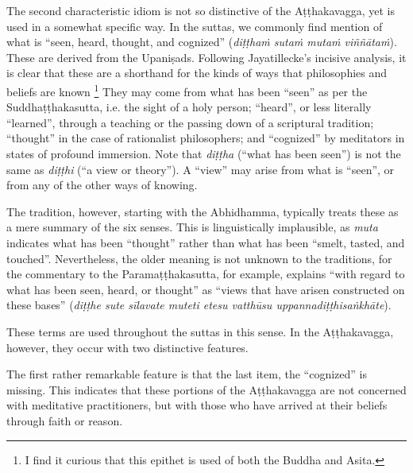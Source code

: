 \documentclass[12pt,openany]{book}%
\begin{document}
The second characteristic idiom is not so distinctive of the \textsanskrit{Aṭṭhakavagga}, yet is used in a somewhat specific way. In the suttas, we commonly find mention of what is “seen, heard, thought, and cognized” (\textit{\textsanskrit{diṭṭhaṁ} \textsanskrit{sutaṁ} \textsanskrit{mutaṁ} \textsanskrit{viññātaṁ}}). These are derived from the \textsanskrit{Upaniṣads}. Following Jayatillecke’s incisive analysis, it is clear that these are a shorthand for the kinds of ways that philosophies and beliefs are known \footnote{I find it curious that this epithet is used of both the Buddha and Asita. } They may come from what has been “seen” as per the \textsanskrit{Suddhaṭṭhakasutta}, i.e. the sight of a holy person; “heard”, or less literally “learned”, through a teaching or the passing down of a scriptural tradition; “thought” in the case of rationalist philosophers; and “cognized” by meditators in states of profound immersion. Note that \textit{\textsanskrit{diṭṭha}} (“what has been seen”) is not the same as \textit{\textsanskrit{diṭṭhi}} (“a view or theory”). A “view” may arise from what is “seen”, or from any of the other ways of knowing.

The tradition, however, starting with the Abhidhamma, typically treats these as a mere summary of the six senses. This is linguistically implausible, as \textit{muta} indicates what has been “thought” rather than what has been “smelt, tasted, and touched”. Nevertheless, the older meaning is not unknown to the traditions, for the commentary to the \textsanskrit{Paramaṭṭhakasutta}, for example, explains “with regard to what has been seen, heard, or thought” as “views that have arisen constructed on these bases” (\textit{\textsanskrit{diṭṭhe} sute \textsanskrit{sīlavate} muteti etesu \textsanskrit{vatthūsu} \textsanskrit{uppannadiṭṭhisaṅkhāte}}).

These terms are used throughout the suttas in this sense. In the \textsanskrit{Aṭṭhakavagga}, however, they occur with two distinctive features.

The first rather remarkable feature is that the last item, the “cognized” is missing. This indicates that these portions of the \textsanskrit{Aṭṭhakavagga} are not concerned with meditative practitioners, but with those who have arrived at their beliefs through faith or reason.
\end{document}
